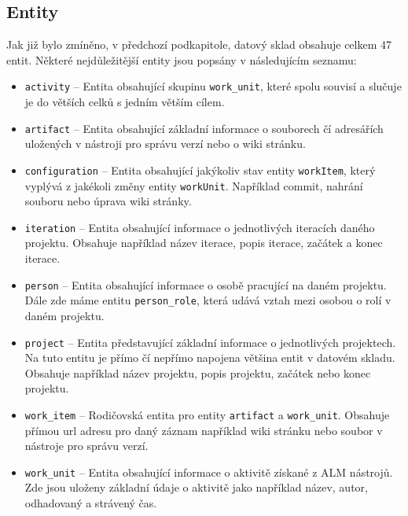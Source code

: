 \documentclass[czech,DP]{thesiskiv}
\begin{document}
\subsection{Entity}\label{sec:spade_entity}
Jak již bylo zmíněno, v předchozí podkapitole, datový sklad obsahuje celkem 47 entit. Některé nejdůležitější entity jsou popsány v následujícím seznamu:
\begin{itemize}
    \item \texttt{activity} -- Entita obsahující skupinu \texttt{work\_unit}, které spolu souvisí a slučuje je do větších celků s jedním větším cílem.
    \item \texttt{artifact} -- Entita obsahující základní informace o souborech čí adresářích uložených v nástroji pro správu verzí nebo o wiki stránku.
    \item \texttt{configuration} -- Entita obsahující jakýkoliv stav entity \texttt{workItem}, který vyplývá z jakékoli změny entity \texttt{workUnit}. Například commit, nahrání souboru nebo úprava wiki stránky.
    \item \texttt{iteration} -- Entita obsahující informace o jednotlivých iteracích daného projektu. Obsahuje například název iterace, popis iterace, začátek a konec iterace.
    \item \texttt{person} -- Entita obsahující informace o osobě pracující na daném projektu. Dále zde máme entitu \texttt{person\_role}, která udává vztah mezi osobou o rolí v daném projektu.
    \item \texttt{project} -- Entita představující základní informace o jednotlivých projektech. Na tuto entitu je přímo čí nepřímo napojena většina entit v datovém skladu. Obsahuje například název projektu, popis projektu, začátek nebo konec projektu.
    \item \texttt{work\_item} -- Rodičovská entita pro entity \texttt{artifact} a \texttt{work\_unit}. Obsahuje přímou url adresu pro daný záznam například wiki stránku nebo soubor v nástroje pro správu verzí.
    \item \texttt{work\_unit} -- Entita obsahující informace o aktivitě získané z ALM nástrojů. Zde jsou uloženy základní údaje o aktivitě jako například název, autor, odhadovaný a strávený čas. 
\end{itemize}
\end{document}
